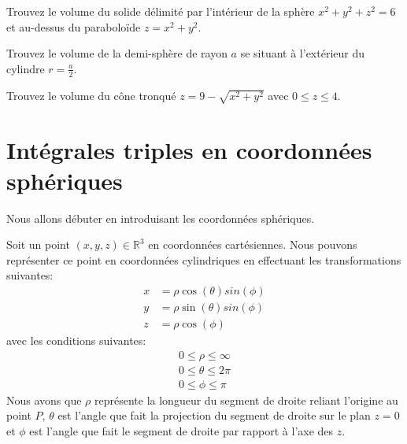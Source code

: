 \documentclass[]{book}
\theoremstyle{definition}
\theoremstyle{definition}
\theoremstyle{definition}
\theoremstyle{remark}
\let\BeginKnitrBlock\begin \let\EndKnitrBlock\end
\begin{document}
\BeginKnitrBlock{example}
\protect\hypertarget{exm:unnamed-chunk-282}{}{\label{exm:unnamed-chunk-282}
}Trouvez le volume du solide délimité par l'intérieur de la sphère
\(x^2+y^2+z^2=6\) et au-dessus du paraboloïde \(z=x^2+y^2\).
\EndKnitrBlock{example}
\vspace*{10cm}

\BeginKnitrBlock{example}
\protect\hypertarget{exm:unnamed-chunk-283}{}{\label{exm:unnamed-chunk-283}
}Trouvez le volume de la demi-sphère de rayon \(a\) se situant à
l'extérieur du cylindre \(r=\frac{a}{2}\).
\EndKnitrBlock{example}
\vspace*{8cm}

\BeginKnitrBlock{example}
\protect\hypertarget{exm:unnamed-chunk-284}{}{\label{exm:unnamed-chunk-284}
}Trouvez le volume du cône tronqué \(z=9-\sqrt{x^2+y^2}\) avec
\(0\leq z \leq 4\).
\EndKnitrBlock{example}
\vspace*{8cm}

\hypertarget{integrales-triples-en-coordonnees-spheriques}{%
\section{Intégrales triples en coordonnées
sphériques}\label{integrales-triples-en-coordonnees-spheriques}}

Nous allons débuter en introduisant les coordonnées sphériques.
\BeginKnitrBlock{definition}[Coordonnées sphériques]
\protect\hypertarget{def:unnamed-chunk-285}{}{\label{def:unnamed-chunk-285}
{} }Soit un point
\((x,y,z)\in\mathbb{R}^3\) en coordonnées cartésiennes. Nous pouvons
représenter ce point en coordonnées cylindriques en effectuant les
transformations suivantes: \begin{align*}
x &= \rho\cos(\theta)sin(\phi) \\
y &= \rho\sin(\theta)sin(\phi) \\
z &= \rho\cos(\phi)
\end{align*} avec les conditions suivantes: \begin{align*}
0 \leq \rho \leq \infty \\
0 \leq \theta \leq 2\pi \\
0\leq \phi \leq \pi
\end{align*} Nous avons que \(\rho\) représente la longueur du segment
de droite reliant l'origine au point \(P\), \(\theta\) est l'angle que
fait la projection du segment de droite sur le plan \(z=0\) et \(\phi\)
est l'angle que fait le segment de droite par rapport à l'axe des \(z\).
\EndKnitrBlock{definition}
\end{document}
